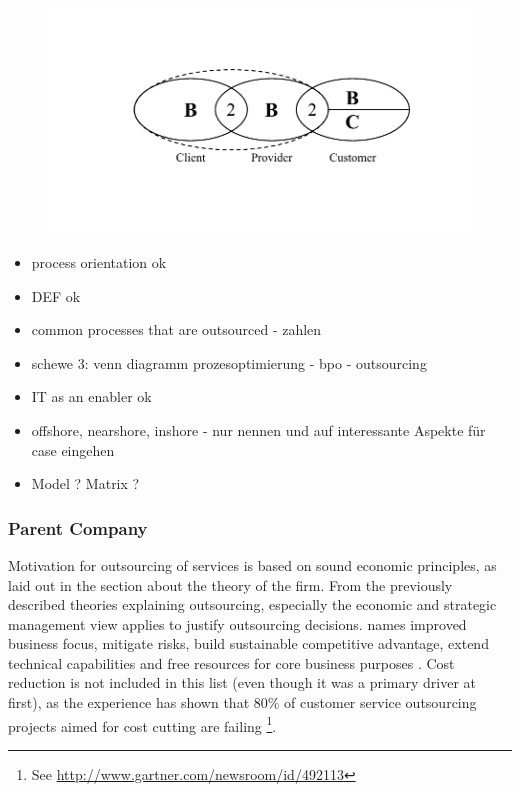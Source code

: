 		\begin{figure}[caption={BPO B2B2B/C Chain}, label={fig:bpochain}]
	{	\includegraphics[width=.8\textwidth]{figures/bpochain.pdf}}
	\end{figure}

			
		\begin{itemize}
			\item process orientation  ok
			\item DEF ok 
			\item common processes that are outsourced - zahlen
			\item schewe 3: venn diagramm prozesoptimierung - bpo - outsourcing
			
			\item IT as an enabler ok 
			\item offshore, nearshore, inshore - nur nennen und auf interessante Aspekte für case eingehen
			\item Model ? Matrix ? 
		\end{itemize}
	
		\subsubsection{Parent Company}
		Motivation for outsourcing of services is based on sound economic principles, as laid out in the section about the theory of the firm. From the previously described theories explaining outsourcing, especially the economic and strategic management view applies to justify outsourcing decisions. \citeauthor{bartell1998information} names improved business focus, mitigate risks, build sustainable competitive advantage, extend technical capabilities and free resources for core business purposes \cite{bartell1998information}. Cost reduction is not included in this list (even though it was a primary driver at first), as the experience has shown that 80\% of customer service outsourcing projects aimed for cost cutting are failing \footnote{See \url{http://www.gartner.com/newsroom/id/492113}}. 
		
